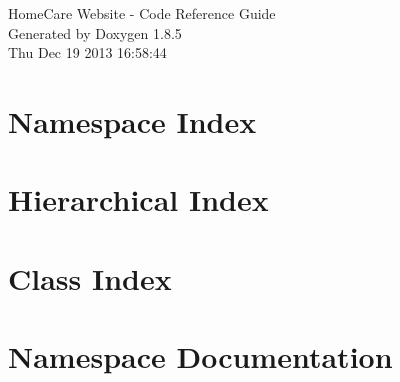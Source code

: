 \documentclass[twoside]{book}
\newcommand{\clearemptydoublepage}{%
  \newpage{\pagestyle{empty}\cleardoublepage}%
}
\begin{document}
\hypersetup{pageanchor=false}
\begin{titlepage}
\vspace*{7cm}
\begin{center}%
{\Large Home\-Care Website -\/ Code Reference Guide }\\
\vspace*{1cm}
{\large Generated by Doxygen 1.8.5}\\
\vspace*{0.5cm}
{\small Thu Dec 19 2013 16:58:44}\\
\end{center}
\end{titlepage}
\clearemptydoublepage
\tableofcontents
\clearemptydoublepage
{}
\hypersetup{pageanchor=true}

\chapter{Namespace Index}

\chapter{Hierarchical Index}

\chapter{Class Index}

\chapter{Namespace Documentation}

\end{document}
